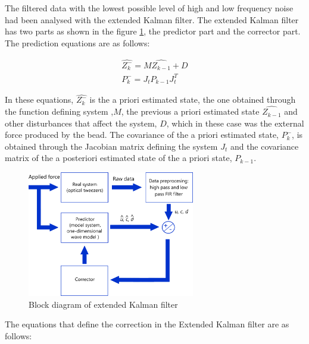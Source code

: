 \documentclass[12pt, a4paper]{article} %
\begin{document}
\setlength{\parskip}{0mm}

The filtered data with the lowest possible level of high and low frequency noise had been analysed with the extended Kalman filter. The extended Kalman filter has two parts as shown in the figure \ref{fig:kalman_esq}, the predictor part and the corrector part. The prediction equations are as follows:

\setlength{\parskip}{4mm}

\begin{equation} \label{eqn:predictor}
    \begin{array}{ l }

    \hat{Z_{k}^{-}} = M\hat{Z_{k-1}} + D \\
    P_{k}^{-} = J_{t}P_{k-1}J_{t}^{T}
    
    \end{array}
\end{equation}

In these equations, $\hat{Z_{k}^{-}}$ is the a priori estimated state, the one obtained through the function defining system ,$M$, the previous a priori estimated state $\hat{Z_{k-1}}$ and other disturbances that affect the system, $D$, which in these case was the external force produced by the bead.
The covariance of the a priori estimated state, $P_{k}^{-}$, is obtained through the Jacobian matrix defining the system $J_{t}$ and the covariance matrix of the a posteriori estimated state of the a priori state, $P_{k-1}$.

\begin{figure}[htbp]
	\centering
	\includegraphics[width=0.65\textwidth]{figures/esquema_extended_kalman_filter.png}
	\caption{Block diagram of extended Kalman filter}
	\label{fig:kalman_esq}
\end{figure}

The equations that define the correction in the Extended Kalman filter are as follows:
\end{document}
